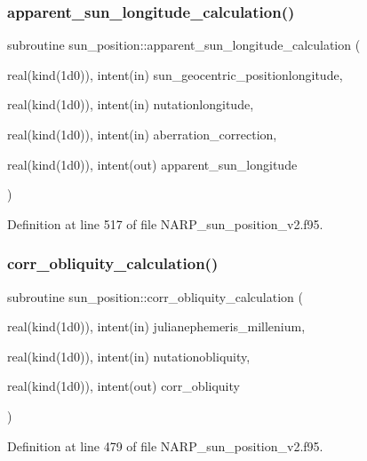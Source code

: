 \subsubsection{\texorpdfstring{apparent\+\_\+sun\+\_\+longitude\+\_\+calculation()}{apparent\_sun\_longitude\_calculation()}}
{\footnotesize\ttfamily subroutine sun\+\_\+position\+::apparent\+\_\+sun\+\_\+longitude\+\_\+calculation (\begin{DoxyParamCaption}\item[{real(kind(1d0)), intent(in)}]{sun\+\_\+geocentric\+\_\+positionlongitude,  }\item[{real(kind(1d0)), intent(in)}]{nutationlongitude,  }\item[{real(kind(1d0)), intent(in)}]{aberration\+\_\+correction,  }\item[{real(kind(1d0)), intent(out)}]{apparent\+\_\+sun\+\_\+longitude }\end{DoxyParamCaption})}



Definition at line 517 of file N\+A\+R\+P\+\_\+sun\+\_\+position\+\_\+v2.\+f95.

\mbox{\label{_n_a_r_p__sun__position__v2_8f95_ac86a544be72626a952ea0d3f32e1a2e6}} 
\subsubsection{\texorpdfstring{corr\+\_\+obliquity\+\_\+calculation()}{corr\_obliquity\_calculation()}}
{\footnotesize\ttfamily subroutine sun\+\_\+position\+::corr\+\_\+obliquity\+\_\+calculation (\begin{DoxyParamCaption}\item[{real(kind(1d0)), intent(in)}]{julianephemeris\+\_\+millenium,  }\item[{real(kind(1d0)), intent(in)}]{nutationobliquity,  }\item[{real(kind(1d0)), intent(out)}]{corr\+\_\+obliquity }\end{DoxyParamCaption})}



Definition at line 479 of file N\+A\+R\+P\+\_\+sun\+\_\+position\+\_\+v2.\+f95.

